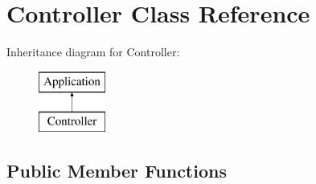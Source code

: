 \hypertarget{class_controller}{}\section{Controller Class Reference}
\label{class_controller}
Inheritance diagram for Controller\+:\begin{figure}[H]
\begin{center}
\leavevmode
\includegraphics[height=2.000000cm]{class_controller}
\end{center}
\end{figure}
\subsection*{Public Member Functions}

